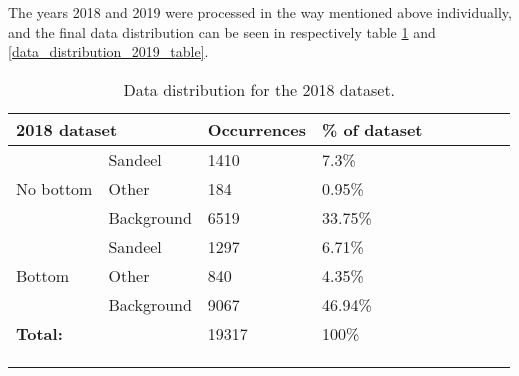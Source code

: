 

        The years 2018 and 2019 were processed in the way mentioned above individually, and the final data distribution can be seen in respectively table \ref{data_distribution_2018_table} and \ref{data_distribution_2019_table}.



\begin{longtable}{lllllllll}
\caption[2018 data distribution]{Data distribution for the 2018 dataset.}
\\ \cline{1-4}
\multicolumn{2}{|l|}{\textbf{2018 dataset}} & \multicolumn{1}{l|}{Occurrences} & \multicolumn{1}{l|}{\% of dataset} &  &  &  &  &  \\ \cline{1-4}
\endfirsthead
%
\endhead
%
                     & Sandeel              & 1410                             & 7.3\%                              &  &  &  &  &  \\
No bottom            & Other                & 184                              & 0.95\%                             &  &  &  &  &  \\
                     & Background           & 6519                             & 33.75\%                            &  &  &  &  &  \\ \cline{1-4}
                     & Sandeel              & 1297                             & 6.71\%                             &  &  &  &  &  \\
Bottom               & Other                & 840                              & 4.35\%                             &  &  &  &  &  \\
                     & Background           & 9067                             & 46.94\%                            &  &  &  &  &  \\ \cline{1-4}
\multicolumn{2}{l}{\textbf{Total:}}         & 19317                            & 100\%                              &  &  &  &  &  \\ \cline{1-4}
                     &                      &                                  &                                    &  &  &  &  &  \\
                     &                      &                                  &                                    &  &  &  &  & 
\\ \label{data_distribution_2018_table}
\end{longtable}

